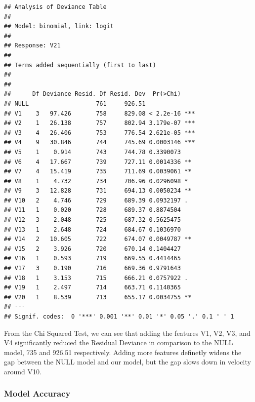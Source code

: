 \documentclass[]{article}
\newenvironment{Shaded}{\begin{snugshade}}{\end{snugshade}}
\newcommand{\KeywordTok}[1]{\textcolor[rgb]{0.13,0.29,0.53}{\textbf{#1}}}
\newcommand{\DataTypeTok}[1]{\textcolor[rgb]{0.13,0.29,0.53}{#1}}
\newcommand{\DecValTok}[1]{\textcolor[rgb]{0.00,0.00,0.81}{#1}}
\newcommand{\StringTok}[1]{\textcolor[rgb]{0.31,0.60,0.02}{#1}}
\newcommand{\OperatorTok}[1]{\textcolor[rgb]{0.81,0.36,0.00}{\textbf{#1}}}
\newcommand{\NormalTok}[1]{#1}
\begin{document}
\begin{verbatim}
## Analysis of Deviance Table
## 
## Model: binomial, link: logit
## 
## Response: V21
## 
## Terms added sequentially (first to last)
## 
## 
##      Df Deviance Resid. Df Resid. Dev  Pr(>Chi)    
## NULL                   761     926.51              
## V1    3   97.426       758     829.08 < 2.2e-16 ***
## V2    1   26.138       757     802.94 3.179e-07 ***
## V3    4   26.406       753     776.54 2.621e-05 ***
## V4    9   30.846       744     745.69 0.0003146 ***
## V5    1    0.914       743     744.78 0.3390073    
## V6    4   17.667       739     727.11 0.0014336 ** 
## V7    4   15.419       735     711.69 0.0039061 ** 
## V8    1    4.732       734     706.96 0.0296098 *  
## V9    3   12.828       731     694.13 0.0050234 ** 
## V10   2    4.746       729     689.39 0.0932197 .  
## V11   1    0.020       728     689.37 0.8874504    
## V12   3    2.048       725     687.32 0.5625475    
## V13   1    2.648       724     684.67 0.1036970    
## V14   2   10.605       722     674.07 0.0049787 ** 
## V15   2    3.926       720     670.14 0.1404427    
## V16   1    0.593       719     669.55 0.4414465    
## V17   3    0.190       716     669.36 0.9791643    
## V18   1    3.153       715     666.21 0.0757922 .  
## V19   1    2.497       714     663.71 0.1140365    
## V20   1    8.539       713     655.17 0.0034755 ** 
## ---
## Signif. codes:  0 '***' 0.001 '**' 0.01 '*' 0.05 '.' 0.1 ' ' 1
\end{verbatim}

From the Chi Squared Test, we can see that adding the features V1, V2,
V3, and V4 significantly reduced the Residual Deviance in comparison to
the NULL model, 735 and 926.51 respectively. Adding more features
definetly widens the gap between the NULL model and our model, but the
gap slows down in velocity around V10.

\subsubsection{Model Accuracy}\label{model-accuracy}

\begin{Shaded}
\end{Shaded}
\end{document}
